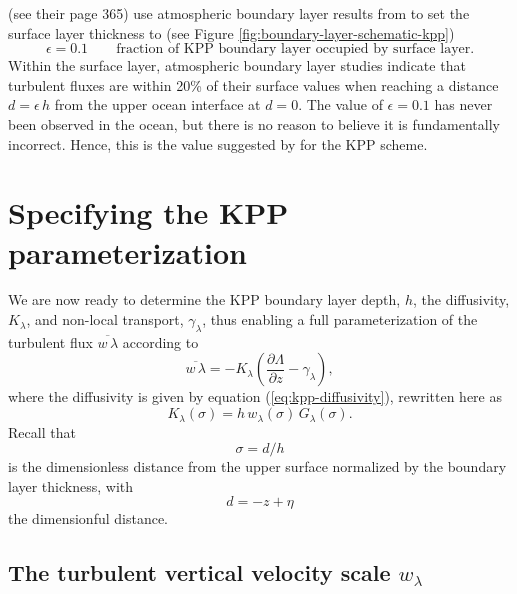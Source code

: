 \cite{LargeKPP} (see their page 365) use atmospheric boundary layer
results from \cite{Tennekes1973} to set the surface layer thickness to
(see Figure \ref{fig:boundary-layer-schematic-kpp})
\begin{equation}
 \epsilon = 0.1  \qquad \mbox{fraction of KPP boundary layer occupied by
   surface layer.}
\label{eq:epsilon-kpp}
\end{equation}
Within the surface layer, atmospheric boundary layer studies indicate
that turbulent fluxes are within 20\% of their surface values when
reaching a distance $d=\epsilon \, h$ from the upper ocean interface
at $d=0$.  The value of $\epsilon=0.1$ has never been observed in the
ocean, but there is no reason to believe it is fundamentally
incorrect. Hence, this is the value suggested by \cite{LargeKPP} for
the KPP scheme.


 
\section{Specifying the KPP parameterization}
\label{section:specifying-kpp-diffusivity-nonlocal}

We are now ready to determine the KPP boundary layer depth, $h$, the
diffusivity, $K_{\lambda}$, and non-local transport,
$\gamma_{\lambda}$, thus enabling a full parameterization of the
turbulent flux $\overline{w \, \lambda}$ according to
\begin{equation}
  \overline{w \, \lambda}= -K_{\lambda} \left( \frac{\partial \Lambda}{\partial z} - \gamma_{\lambda} \right),
\label{eq:kpp-parameterization-again}
\end{equation}
where the diffusivity is given by equation (\ref{eq:kpp-diffusivity}),
rewritten here as
\begin{equation}
 K_{\lambda}(\sigma) = h \, w_{\lambda}(\sigma) \, G_{\lambda}(\sigma).
\label{eq:kpp-diffusivity-again}
\end{equation}
Recall that 
\begin{equation}
  \sigma = d/h
\end{equation}
is the dimensionless distance from the upper surface normalized by the
boundary layer thickness, with
\begin{equation}
 d = -z + \eta
\end{equation}
 the dimensionful distance.  

\subsection{The turbulent vertical velocity scale $w_{\lambda}$} 
\label{subsection:vertical-velocity-scale}

